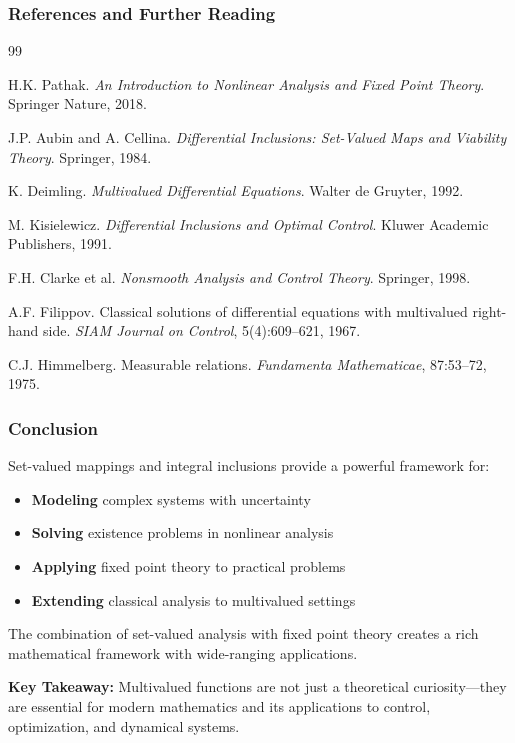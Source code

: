 \documentclass[aspectratio=169,10pt]{beamer}
\begin{document}
\begin{frame}[allowframebreaks]
\frametitle{References and Further Reading}

\small
\begin{thebibliography}{99}

H.K. Pathak. \emph{An Introduction to Nonlinear Analysis and Fixed Point Theory}. Springer Nature, 2018.

J.P. Aubin and A. Cellina. \emph{Differential Inclusions: Set-Valued Maps and Viability Theory}. Springer, 1984.

K. Deimling. \emph{Multivalued Differential Equations}. Walter de Gruyter, 1992.

M. Kisielewicz. \emph{Differential Inclusions and Optimal Control}. Kluwer Academic Publishers, 1991.

F.H. Clarke et al. \emph{Nonsmooth Analysis and Control Theory}. Springer, 1998.

A.F. Filippov. Classical solutions of differential equations with multivalued right-hand side.
\emph{SIAM Journal on Control}, 5(4):609--621, 1967.

C.J. Himmelberg. Measurable relations. \emph{Fundamenta Mathematicae}, 87:53--72, 1975.

\end{thebibliography}

\end{frame}

\begin{frame}
\frametitle{Conclusion}

\Large\centering

Set-valued mappings and integral inclusions provide a powerful framework for:

\vspace{0.5cm}

\begin{itemize}
    \item \textbf{Modeling} complex systems with uncertainty
    \item \textbf{Solving} existence problems in nonlinear analysis
    \item \textbf{Applying} fixed point theory to practical problems
    \item \textbf{Extending} classical analysis to multivalued settings
\end{itemize}

\vspace{0.5cm}

The combination of set-valued analysis with fixed point theory creates a rich mathematical framework with wide-ranging applications.

\vspace{1cm}

\normalsize
\textbf{Key Takeaway:} Multivalued functions are not just a theoretical curiosity—they are essential for modern mathematics and its applications to control, optimization, and dynamical systems.

\end{frame}
\end{document}

